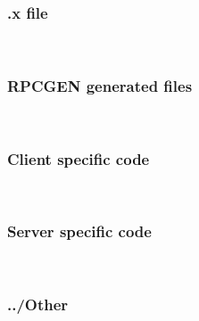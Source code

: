 \documentclass{article}
\begin{document}
 \subsubsection{.x file}~
   
 
  \subsubsection{RPCGEN generated files}~
  	      
 	     
	     
 	  
 \subsubsection{Client specific code}~
    
    \subsubsection{Server specific code}~
    
    \subsubsection{../Other}~
    
    
     
\end{document}
